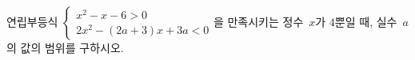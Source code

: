 연립부등식 $\begin{cases} x^2-x-6>0 \\ 2x^2-(2a+3)x+3a<0 \end{cases}$을 만족시키는 정수~$x$가 $4$뿐일 때, 실수~$a$의 값의 범위를 구하시오.
